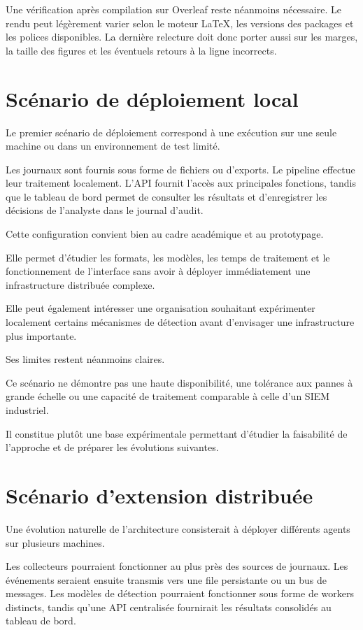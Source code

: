 Une vérification après compilation sur Overleaf reste néanmoins nécessaire. Le rendu peut légèrement varier selon le moteur LaTeX, les versions des packages et les polices disponibles. La dernière relecture doit donc porter aussi sur les marges, la taille des figures et les éventuels retours à la ligne incorrects.

\section{Scénario de déploiement local}

Le premier scénario de déploiement correspond à une exécution sur une seule machine ou dans un environnement de test limité.

Les journaux sont fournis sous forme de fichiers ou d'exports. Le pipeline effectue leur traitement localement. L'API fournit l'accès aux principales fonctions, tandis que le tableau de bord permet de consulter les résultats et d'enregistrer les décisions de l'analyste dans le journal d'audit.

Cette configuration convient bien au cadre académique et au prototypage.

Elle permet d'étudier les formats, les modèles, les temps de traitement et le fonctionnement de l'interface sans avoir à déployer immédiatement une infrastructure distribuée complexe.

Elle peut également intéresser une organisation souhaitant expérimenter localement certains mécanismes de détection avant d'envisager une infrastructure plus importante.

Ses limites restent néanmoins claires.

Ce scénario ne démontre pas une haute disponibilité, une tolérance aux pannes à grande échelle ou une capacité de traitement comparable à celle d'un SIEM industriel.

Il constitue plutôt une base expérimentale permettant d'étudier la faisabilité de l'approche et de préparer les évolutions suivantes.

\section{Scénario d'extension distribuée}

Une évolution naturelle de l'architecture consisterait à déployer différents agents sur plusieurs machines.

Les collecteurs pourraient fonctionner au plus près des sources de journaux. Les événements seraient ensuite transmis vers une file persistante ou un bus de messages. Les modèles de détection pourraient fonctionner sous forme de workers distincts, tandis qu'une API centralisée fournirait les résultats consolidés au tableau de bord.

